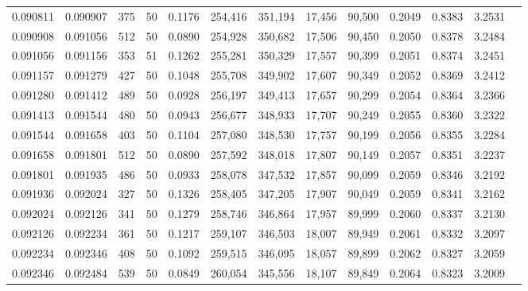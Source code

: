\begin{tabular}{rrrrrrrrrrrrr}
0.090811 & 0.090907 &   375 &  50 &                                     0.1176 & 254,416 & 351,194 &  17,456 &  90,500 & 0.2049 & 0.8383 & 3.2531 \\
0.090908 & 0.091056 &   512 &  50 &                                     0.0890 & 254,928 & 350,682 &  17,506 &  90,450 & 0.2050 & 0.8378 & 3.2484 \\
0.091056 & 0.091156 &   353 &  51 &                                     0.1262 & 255,281 & 350,329 &  17,557 &  90,399 & 0.2051 & 0.8374 & 3.2451 \\
0.091157 & 0.091279 &   427 &  50 &                                     0.1048 & 255,708 & 349,902 &  17,607 &  90,349 & 0.2052 & 0.8369 & 3.2412 \\
0.091280 & 0.091412 &   489 &  50 &                                     0.0928 & 256,197 & 349,413 &  17,657 &  90,299 & 0.2054 & 0.8364 & 3.2366 \\
0.091413 & 0.091544 &   480 &  50 &                                     0.0943 & 256,677 & 348,933 &  17,707 &  90,249 & 0.2055 & 0.8360 & 3.2322 \\
0.091544 & 0.091658 &   403 &  50 &                                     0.1104 & 257,080 & 348,530 &  17,757 &  90,199 & 0.2056 & 0.8355 & 3.2284 \\
0.091658 & 0.091801 &   512 &  50 &                                     0.0890 & 257,592 & 348,018 &  17,807 &  90,149 & 0.2057 & 0.8351 & 3.2237 \\
0.091801 & 0.091935 &   486 &  50 &                                     0.0933 & 258,078 & 347,532 &  17,857 &  90,099 & 0.2059 & 0.8346 & 3.2192 \\
0.091936 & 0.092024 &   327 &  50 &                                     0.1326 & 258,405 & 347,205 &  17,907 &  90,049 & 0.2059 & 0.8341 & 3.2162 \\
0.092024 & 0.092126 &   341 &  50 &                                     0.1279 & 258,746 & 346,864 &  17,957 &  89,999 & 0.2060 & 0.8337 & 3.2130 \\
0.092126 & 0.092234 &   361 &  50 &                                     0.1217 & 259,107 & 346,503 &  18,007 &  89,949 & 0.2061 & 0.8332 & 3.2097 \\
0.092234 & 0.092346 &   408 &  50 &                                     0.1092 & 259,515 & 346,095 &  18,057 &  89,899 & 0.2062 & 0.8327 & 3.2059 \\
0.092346 & 0.092484 &   539 &  50 &                                     0.0849 & 260,054 & 345,556 &  18,107 &  89,849 & 0.2064 & 0.8323 & 3.2009 \\

\end{tabular}
